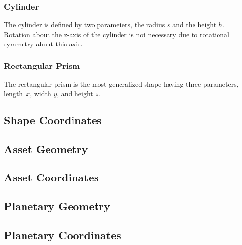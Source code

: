 \documentclass{article}
\begin{document}
\subsubsection{Cylinder}
\label{sssec:Cylinder}
The cylinder is defined by two parameters, the radius $s$ and the height $h$. Rotation about the z-axis of the cylinder is not necessary due to rotational symmetry about this axis.



\subsubsection{Rectangular Prism}
\label{sssec:RectangularPrism}
The rectangular prism is the most generalized shape having three parameters, length~$x$, width $y$, and height $z$.


\subsection{Shape Coordinates}
\label{ssec:ShapeCoordinates}


\subsection{Asset Geometry}
\label{ssec:AssetGeometry}


\subsection{Asset Coordinates}
\label{ssec:AssetCoordinates}


\subsection{Planetary Geometry}
\label{ssec:PlanetaryGeometry}

\subsection{Planetary Coordinates}
\label{ssec:PlanetaryCoordinates}
\end{document}
